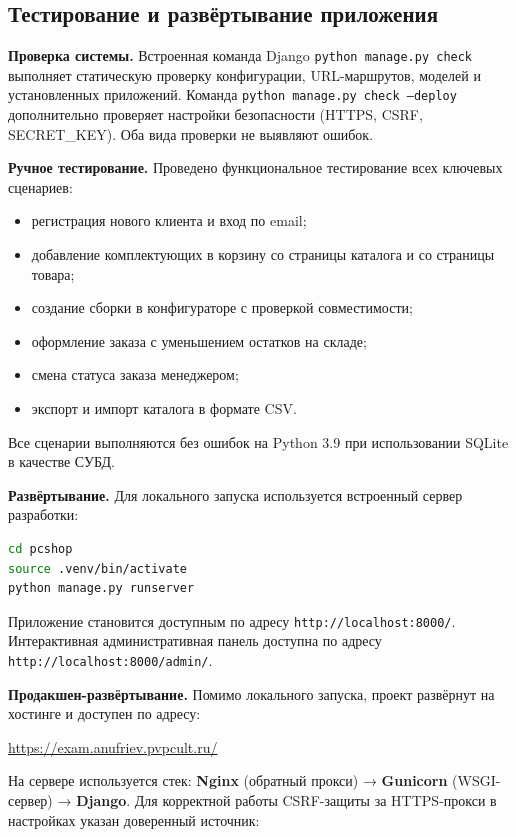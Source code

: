 \subsection{Тестирование и развёртывание приложения}

\textbf{Проверка системы.} Встроенная команда Django \texttt{python manage.py check} выполняет статическую проверку конфигурации, URL-маршрутов, моделей и установленных приложений. Команда \texttt{python manage.py check --deploy} дополнительно проверяет настройки безопасности (HTTPS, CSRF, SECRET\_KEY). Оба вида проверки не выявляют ошибок.

\textbf{Ручное тестирование.} Проведено функциональное тестирование всех ключевых сценариев:
\begin{itemize}
    \item регистрация нового клиента и вход по email;
    \item добавление комплектующих в корзину со страницы каталога и со страницы товара;
    \item создание сборки в конфигураторе с проверкой совместимости;
    \item оформление заказа с уменьшением остатков на складе;
    \item смена статуса заказа менеджером;
    \item экспорт и импорт каталога в формате CSV.
\end{itemize}

Все сценарии выполняются без ошибок на Python 3.9 при использовании SQLite в качестве СУБД.

\textbf{Развёртывание.} Для локального запуска используется встроенный сервер разработки:

\begin{lstlisting}[language=bash, caption={Запуск сервера разработки}]
cd pcshop
source .venv/bin/activate
python manage.py runserver
\end{lstlisting}

Приложение становится доступным по адресу \texttt{http://localhost:8000/}. Интерактивная административная панель доступна по адресу \texttt{http://localhost:8000/admin/}.

\textbf{Продакшен-развёртывание.} Помимо локального запуска, проект развёрнут на хостинге и доступен по адресу:

\begin{center}
\url{https://exam.anufriev.pvpcult.ru/}
\end{center}

На сервере используется стек: \textbf{Nginx} (обратный прокси) → \textbf{Gunicorn} (WSGI-сервер) → \textbf{Django}. Для корректной работы CSRF-защиты за HTTPS-прокси в настройках указан доверенный источник:

